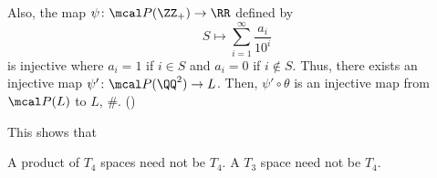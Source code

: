 \documentclass[MAS331_Note.tex]{subfiles}
\begin{document}
{    Also, the map $\psi \colon \mcal P(\ZZ_+) \to \RR$ defined by
    \[
        S \mapsto \sum_{i=1}^{\infty} \frac{a_i}{10^i}
    \] is injective where $a_i = 1$ if $i \in S$ and $a_i = 0$ if $i \notin S$.
    Thus, there exists an injective map $\psi' \colon \mcal
    P(\QQ^2) \to L$. Then, $\psi' \circ \theta$ is an injective map from
    $\mcal P(L)$ to $L$, \#. ()

    This shows that
    \begin{enumerate}[nolistsep, label=(\roman*)]
        \ii A product of $T_4$ spaces need not be $T_4$.
        \ii A $T_3$ space need not be $T_4$.
    \end{enumerate}
}

\end{document}
